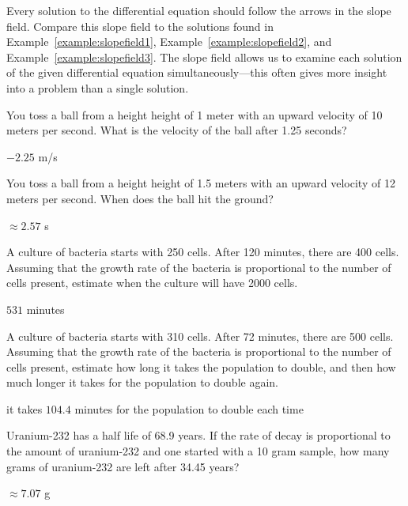 Every solution to the differential equation should follow the arrows
in the slope field.  Compare this slope field to the solutions found
in Example~\ref{example:slopefield1},
Example~\ref{example:slopefield2}, and
Example~\ref{example:slopefield3}. The slope field allows us to
examine each solution of the given differential equation
simultaneously---this often gives more insight into a problem than a
single solution.

\begin{exercises}

\begin{exercise}
You toss a ball from a height height of 1 meter with an upward
velocity of 10 meters per second. What is the velocity of the ball
after 1.25 seconds?
\begin{answer}
$-2.25$ m/s
\end{answer}
\end{exercise}

\begin{exercise}
You toss a ball from a height height of 1.5 meters with an upward
velocity of 12 meters per second. When does the ball hit the ground?
\begin{answer}
$\approx 2.57$ s
\end{answer}
\end{exercise}

\begin{exercise}
A culture of bacteria starts with 250 cells. After 120 minutes, there
are 400 cells. Assuming that the growth rate of the bacteria is
proportional to the number of cells present, estimate when the
culture will have 2000 cells.
\begin{answer}
$531$ minutes
\end{answer}
\end{exercise}

\begin{exercise}
A culture of bacteria starts with 310 cells. After 72 minutes, there
are 500 cells. Assuming that the growth rate of the bacteria is
proportional to the number of cells present, estimate how long it takes the
population to double, and then how much longer it takes for the population to double again.
\begin{answer}
it takes $104.4$ minutes for the population to double each time
\end{answer}
\end{exercise}

\begin{exercise}
Uranium-232 has a half life of 68.9 years. If the rate of decay is
proportional to the amount of uranium-232 and one started with a 10
gram sample, how many grams of uranium-232 are left after 34.45 years?
\begin{answer}
$\approx 7.07$ g
\end{answer}
\end{exercise}



\end{exercises}
